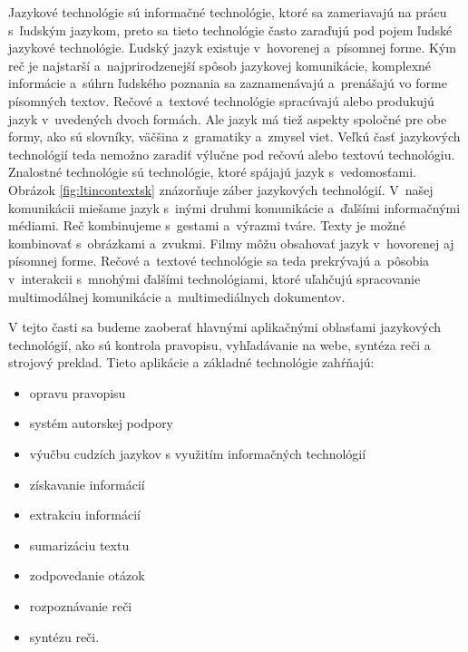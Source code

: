 \clearpage


\begin{multicols}{2}
Jazykové technológie sú informačné technológie, ktoré
sa zameriavajú na prácu s~ľudským jazykom, preto sa tieto
technológie často zaraďujú pod pojem ľudské jazykové
technológie. Ľudský jazyk existuje v~hovorenej a~písomnej forme.
Kým reč je najstarší a~najprirodzenejší spôsob jazykovej
komunikácie, komplexné informácie a~súhrn ľudského poznania sa
zaznamenávajú a~prenášajú vo forme písomných textov. Rečové
a~textové technológie spracúvajú alebo produkujú jazyk v~uvedených
dvoch formách. Ale jazyk má tiež aspekty spoločné pre obe formy,
ako sú slovníky, väčšina z~gramatiky a~zmysel viet. Veľkú časť
jazykových technológií teda nemožno zaradiť výlučne pod rečovú
alebo textovú technológiu. Znalostné technológie sú technológie,
ktoré spájajú jazyk s~vedomosťami. Obrázok \ref{fig:ltincontextsk}
znázorňuje záber jazykových technológií. V~našej komunikácii
miešame jazyk s~inými druhmi komunikácie a~ďalšími informačnými
médiami. Reč kombinujeme s~gestami a~výrazmi tváre. Texty je možné
kombinovať s~obrázkami a~zvukmi. Filmy môžu obsahovať jazyk
v~hovorenej aj písomnej forme. Rečové a~textové technológie sa teda
prekrývajú a~pôsobia v~interakcii s~mnohými ďalšími
technológiami, ktoré uľahčujú spracovanie multimodálnej
komunikácie a~multimediálnych dokumentov.

V tejto časti sa budeme zaoberať hlavnými aplikačnými oblasťami jazykových technológií, ako sú kontrola pravopisu, vyhľadávanie na webe, syntéza reči a strojový preklad. Tieto aplikácie a základné technológie zahŕňajú:

\begin{itemize}
\item opravu pravopisu
\item systém autorskej podpory
\item výučbu cudzích jazykov s využitím informačných technológií
\item získavanie informácií 
\item extrakciu informácií
\item sumarizáciu textu
\item zodpovedanie otázok
\item rozpoznávanie reči 
\item syntézu reči.
\end{itemize}


\end{multicols}
